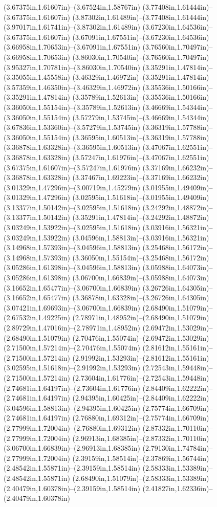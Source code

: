 (3.67375in,1.61607in)--(3.67524in,1.58767in) (3.77408in,1.61444in)--(3.67375in,1.61607in) (3.87302in,1.61489in)--(3.77408in,1.61444in) (3.97017in,1.61741in)--(3.87302in,1.61489in) (3.67230in,1.64536in)--(3.67375in,1.61607in) (3.67091in,1.67551in)--(3.67230in,1.64536in) (3.66958in,1.70653in)--(3.67091in,1.67551in) (3.76560in,1.70497in)--(3.66958in,1.70653in) (3.86030in,1.70540in)--(3.76560in,1.70497in) (3.95327in,1.70781in)--(3.86030in,1.70540in) (3.35291in,1.47814in)--(3.35055in,1.45558in) (3.46329in,1.46972in)--(3.35291in,1.47814in) (3.57359in,1.46350in)--(3.46329in,1.46972in) (3.35536in,1.50166in)--(3.35291in,1.47814in) (3.35789in,1.52613in)--(3.35536in,1.50166in) (3.36050in,1.55154in)--(3.35789in,1.52613in) (3.46669in,1.54344in)--(3.36050in,1.55154in) (3.57279in,1.53745in)--(3.46669in,1.54344in) (3.67836in,1.53360in)--(3.57279in,1.53745in) (3.36319in,1.57788in)--(3.36050in,1.55154in) (3.36595in,1.60513in)--(3.36319in,1.57788in) (3.36878in,1.63328in)--(3.36595in,1.60513in) (3.47067in,1.62551in)--(3.36878in,1.63328in) (3.57247in,1.61976in)--(3.47067in,1.62551in) (3.67375in,1.61607in)--(3.57247in,1.61976in) (3.37169in,1.66232in)--(3.36878in,1.63328in) (3.37467in,1.69223in)--(3.37169in,1.66232in) (3.01329in,1.47296in)--(3.00719in,1.45279in) (3.01955in,1.49409in)--(3.01329in,1.47296in) (3.02595in,1.51618in)--(3.01955in,1.49409in) (3.13377in,1.50142in)--(3.02595in,1.51618in) (3.24292in,1.48872in)--(3.13377in,1.50142in) (3.35291in,1.47814in)--(3.24292in,1.48872in) (3.03249in,1.53922in)--(3.02595in,1.51618in) (3.03916in,1.56321in)--(3.03249in,1.53922in) (3.04596in,1.58813in)--(3.03916in,1.56321in) (3.14968in,1.57393in)--(3.04596in,1.58813in) (3.25468in,1.56172in)--(3.14968in,1.57393in) (3.36050in,1.55154in)--(3.25468in,1.56172in) (3.05286in,1.61398in)--(3.04596in,1.58813in) (3.05988in,1.64073in)--(3.05286in,1.61398in) (3.06700in,1.66839in)--(3.05988in,1.64073in) (3.16652in,1.65477in)--(3.06700in,1.66839in) (3.26726in,1.64305in)--(3.16652in,1.65477in) (3.36878in,1.63328in)--(3.26726in,1.64305in) (3.07421in,1.69693in)--(3.06700in,1.66839in) (2.68490in,1.51079in)--(2.67532in,1.49225in) (2.78971in,1.48952in)--(2.68490in,1.51079in) (2.89729in,1.47016in)--(2.78971in,1.48952in) (2.69472in,1.53029in)--(2.68490in,1.51079in) (2.70476in,1.55074in)--(2.69472in,1.53029in) (2.71500in,1.57214in)--(2.70476in,1.55074in) (2.81612in,1.55161in)--(2.71500in,1.57214in) (2.91992in,1.53293in)--(2.81612in,1.55161in) (3.02595in,1.51618in)--(2.91992in,1.53293in) (2.72543in,1.59448in)--(2.71500in,1.57214in) (2.73604in,1.61776in)--(2.72543in,1.59448in) (2.74681in,1.64197in)--(2.73604in,1.61776in) (2.84409in,1.62222in)--(2.74681in,1.64197in) (2.94395in,1.60425in)--(2.84409in,1.62222in) (3.04596in,1.58813in)--(2.94395in,1.60425in) (2.75774in,1.66709in)--(2.74681in,1.64197in) (2.76880in,1.69312in)--(2.75774in,1.66709in) (2.77999in,1.72004in)--(2.76880in,1.69312in) (2.87332in,1.70110in)--(2.77999in,1.72004in) (2.96913in,1.68385in)--(2.87332in,1.70110in) (3.06700in,1.66839in)--(2.96913in,1.68385in) (2.79130in,1.74784in)--(2.77999in,1.72004in) (2.39159in,1.58514in)--(2.37869in,1.56744in) (2.48542in,1.55871in)--(2.39159in,1.58514in) (2.58333in,1.53389in)--(2.48542in,1.55871in) (2.68490in,1.51079in)--(2.58333in,1.53389in) (2.40479in,1.60378in)--(2.39159in,1.58514in) (2.41827in,1.62336in)--(2.40479in,1.60378in) 